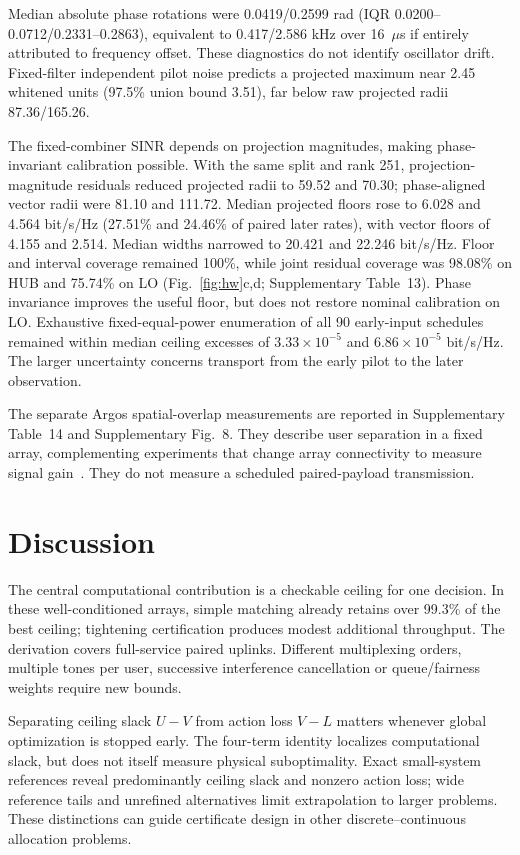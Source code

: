 \documentclass[lineno,pdflatex,sn-nature]{sn-jnl}
\begin{document}
Median absolute phase rotations were 0.0419/0.2599 rad (IQR 0.0200--0.0712/0.2331--0.2863), equivalent to 0.417/2.586 kHz over 16~\(\mu\)s if entirely attributed to frequency offset. These diagnostics do not identify oscillator drift. Fixed-filter independent pilot noise predicts a projected maximum near 2.45 whitened units (97.5\% union bound 3.51), far below raw projected radii 87.36/165.26.

The fixed-combiner SINR depends on projection magnitudes, making phase-invariant calibration possible. With the same split and rank 251, projection-magnitude residuals reduced projected radii to 59.52 and 70.30; phase-aligned vector radii were 81.10 and 111.72. Median projected floors rose to 6.028 and 4.564 bit/s/Hz (27.51\% and 24.46\% of paired later rates), with vector floors of 4.155 and 2.514. Median widths narrowed to 20.421 and 22.246 bit/s/Hz. Floor and interval coverage remained 100\%, while joint residual coverage was 98.08\% on HUB and 75.74\% on LO (Fig.~\ref{fig:hw}c,d; Supplementary Table~13). Phase invariance improves the useful floor, but does not restore nominal calibration on LO. Exhaustive fixed-equal-power enumeration of all 90 early-input schedules remained within median ceiling excesses of \(3.33\times10^{-5}\) and \(6.86\times10^{-5}\) bit/s/Hz. The larger uncertainty concerns transport from the early pilot to the later observation.


The separate Argos spatial-overlap measurements are reported in Supplementary Table~14 and Supplementary Fig.~8. They describe user separation in a fixed array, complementing experiments that change array connectivity to measure signal gain~\cite{ni2026}. They do not measure a scheduled paired-payload transmission.



\section*{Discussion}

The central computational contribution is a checkable ceiling for one decision. In these well-conditioned arrays, simple matching already retains over 99.3\% of the best ceiling; tightening certification produces modest additional throughput. The derivation covers full-service paired uplinks. Different multiplexing orders, multiple tones per user, successive interference cancellation or queue/fairness weights require new bounds.

Separating ceiling slack \(U-V\) from action loss \(V-L\) matters whenever global optimization is stopped early. The four-term identity localizes computational slack, but does not itself measure physical suboptimality. Exact small-system references reveal predominantly ceiling slack and nonzero action loss; wide reference tails and unrefined alternatives limit extrapolation to larger problems. These distinctions can guide certificate design in other discrete--continuous allocation problems.
\end{document}
